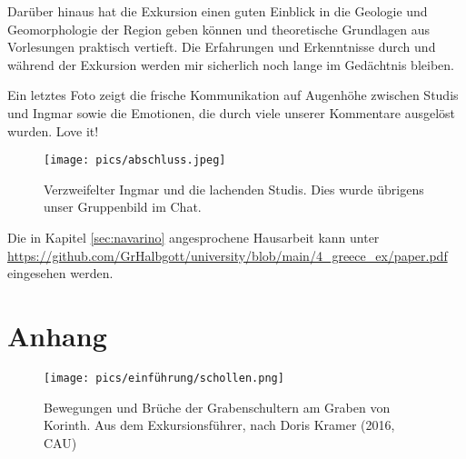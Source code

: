 \documentclass[preprint]{geomorphica} %
\begin{document}
Darüber hinaus hat die Exkursion einen guten Einblick in die Geologie und Geomorphologie der Region geben können und theoretische Grundlagen aus Vorlesungen praktisch vertieft. Die Erfahrungen und Erkenntnisse durch und während der Exkursion werden mir sicherlich noch lange im Gedächtnis bleiben.

Ein letztes Foto zeigt die frische Kommunikation auf Augenhöhe zwischen Studis und Ingmar sowie die Emotionen, die durch viele unserer Kommentare ausgelöst wurden. Love it!

\vspace{10mm}

\begin{figure}[h]
    \centering
    \texttt{[image: pics/abschluss.jpeg]}
    \caption{Verzweifelter Ingmar und die lachenden Studis. Dies wurde übrigens unser Gruppenbild im Chat.}
\end{figure}


\newpage

\renewcommand\refname{Literaturverzeichnis}



\hypertarget{ref:ha}{Die in Kapitel \ref{sec:navarino} angesprochene Hausarbeit kann unter \url{https://github.com/GrHalbgott/university/blob/main/4_greece_ex/paper.pdf} eingesehen werden.}


\newpage

\appendix
\section*{Anhang}

\begin{figure}[h]
    \centering
    \texttt{[image: pics/einführung/schollen.png]}
    \caption{Bewegungen und Brüche der Grabenschultern am Graben von Korinth. Aus dem Exkursionsführer, nach Doris Kramer (2016, CAU)}
    \label{pic:schollen}
\end{figure}
\end{document}
